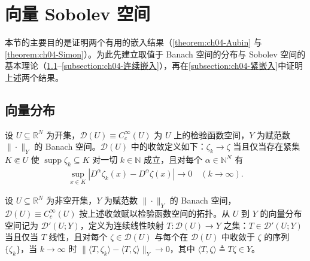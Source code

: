 \documentclass[../../main.tex]{subfiles}%
\begin{document}
\section{向量 Sobolev 空间}\label{section:ch04-向量Sobolev}

本节的主要目的是证明两个有用的嵌入结果（\cref{theorem:ch04-Aubin} 与\cref{theorem:ch04-Simon}）。为此先建立取值于 Banach 空间的分布与 Sobolev 空间的基本理论（\cref{subsection:ch04-向量分布}--\cref{subsection:ch04-连续嵌入}），再在\cref{subsection:ch04-紧嵌入}中证明上述两个结果。

\subsection{向量分布}\label{subsection:ch04-向量分布}

设 $U\subseteq\mathbb{R}^N$ 为开集，$\mathcal{D}(U)\equiv C_c^\infty(U)$ 为 $U$ 上的检验函数空间，$Y$ 为赋范数 $\|\cdot\|_Y$ 的 Banach 空间。$\mathcal{D}(U)$ 中的收敛定义如下：$\zeta_k\to\zeta$ 当且仅当存在紧集 $K\Subset U$ 使 $\operatorname{supp}\zeta_k\subseteq K$ 对一切 $k\in\mathbb{N}$ 成立，且对每个 $\alpha\in\mathbb{N}^N$ 有
\begin{align*}
\sup_{x\in K}|D^\alpha\zeta_k(x)-D^\alpha\zeta(x)|\to0\quad(k\to\infty).
\end{align*}

\begin{definition}[向量分布]\label{definition:ch04-向量分布}
设 $U\subseteq\mathbb{R}^N$ 为非空开集，$Y$ 为赋范数 $\|\cdot\|_Y$ 的 Banach 空间，$\mathcal{D}(U)\equiv C_c^\infty(U)$ 按上述收敛赋以检验函数空间的拓扑。从 $U$ 到 $Y$ 的向量分布空间记为 $\mathcal{D}'(U;Y)$，定义为连续线性映射 $T:\mathcal{D}(U)\to Y$ 之集：$T\in\mathcal{D}'(U;Y)$ 当且仅当 $T$ 线性，且对每个 $\zeta\in\mathcal{D}(U)$ 与每个在 $\mathcal{D}(U)$ 中收敛于 $\zeta$ 的序列 $\{\zeta_k\}$，当 $k\to\infty$ 时 $\|\langle T,\zeta_k\rangle-\langle T,\zeta\rangle\|_Y\to0$，其中 $\langle T,\zeta\rangle\triangleq T\zeta\in Y$。
\end{definition}
\end{document}
